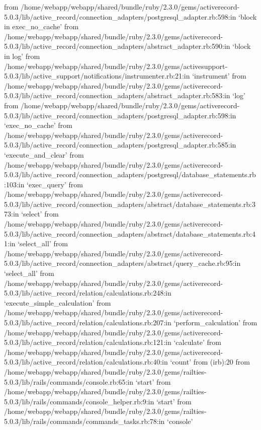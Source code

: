         from /home/webapp/webapp/shared/bundle/ruby/2.3.0/gems/activerecord-5.0.3/lib/active_record/connection_adapters/postgresql_adapter.rb:598:in `block in exec_no_cache'
        from /home/webapp/webapp/shared/bundle/ruby/2.3.0/gems/activerecord-5.0.3/lib/active_record/connection_adapters/abstract_adapter.rb:590:in `block in log'
        from /home/webapp/webapp/shared/bundle/ruby/2.3.0/gems/activesupport-5.0.3/lib/active_support/notifications/instrumenter.rb:21:in `instrument'
        from /home/webapp/webapp/shared/bundle/ruby/2.3.0/gems/activerecord-5.0.3/lib/active_record/connection_adapters/abstract_adapter.rb:583:in `log'
        from /home/webapp/webapp/shared/bundle/ruby/2.3.0/gems/activerecord-5.0.3/lib/active_record/connection_adapters/postgresql_adapter.rb:598:in `exec_no_cache'
        from /home/webapp/webapp/shared/bundle/ruby/2.3.0/gems/activerecord-5.0.3/lib/active_record/connection_adapters/postgresql_adapter.rb:585:in `execute_and_clear'
        from /home/webapp/webapp/shared/bundle/ruby/2.3.0/gems/activerecord-5.0.3/lib/active_record/connection_adapters/postgresql/database_statements.rb:103:in `exec_query'
        from /home/webapp/webapp/shared/bundle/ruby/2.3.0/gems/activerecord-5.0.3/lib/active_record/connection_adapters/abstract/database_statements.rb:373:in `select'
        from /home/webapp/webapp/shared/bundle/ruby/2.3.0/gems/activerecord-5.0.3/lib/active_record/connection_adapters/abstract/database_statements.rb:41:in `select_all'
        from /home/webapp/webapp/shared/bundle/ruby/2.3.0/gems/activerecord-5.0.3/lib/active_record/connection_adapters/abstract/query_cache.rb:95:in `select_all'
        from /home/webapp/webapp/shared/bundle/ruby/2.3.0/gems/activerecord-5.0.3/lib/active_record/relation/calculations.rb:248:in `execute_simple_calculation'
        from /home/webapp/webapp/shared/bundle/ruby/2.3.0/gems/activerecord-5.0.3/lib/active_record/relation/calculations.rb:207:in `perform_calculation'
        from /home/webapp/webapp/shared/bundle/ruby/2.3.0/gems/activerecord-5.0.3/lib/active_record/relation/calculations.rb:121:in `calculate'
        from /home/webapp/webapp/shared/bundle/ruby/2.3.0/gems/activerecord-5.0.3/lib/active_record/relation/calculations.rb:40:in `count'
        from (irb):20
        from /home/webapp/webapp/shared/bundle/ruby/2.3.0/gems/railties-5.0.3/lib/rails/commands/console.rb:65:in `start'
        from /home/webapp/webapp/shared/bundle/ruby/2.3.0/gems/railties-5.0.3/lib/rails/commands/console_helper.rb:9:in `start'
        from /home/webapp/webapp/shared/bundle/ruby/2.3.0/gems/railties-5.0.3/lib/rails/commands/commands_tasks.rb:78:in `console'

